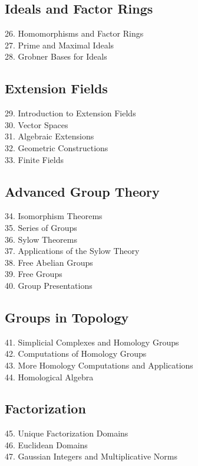 \documentclass{article}
\begin{document}
\begin{spacing}{1.1}
\subsection{Ideals and Factor Rings}
26. Homomorphisms and Factor Rings
\\ 27. Prime and Maximal Ideals
\\ 28. Grobner Bases for Ideals

\subsection{Extension Fields}
29. Introduction to Extension Fields
\\ 30.   Vector Spaces
\\ 31. Algebraic Extensions
\\ 32. Geometric Constructions
\\ 33. Finite Fields

\subsection{Advanced Group Theory}
34. Isomorphism Theorems
\\ 35. Series of Groups
\\ 36. Sylow Theorems
\\ 37. Applications of the Sylow Theory
\\ 38. Free Abelian Groups
\\ 39. Free Groups
\\ 40. Group Presentations

\subsection{Groups in Topology}
41. Simplicial Complexes and Homology Groups
\\ 42. Computations of Homology Groups
\\ 43. More Homology Computations and Applications
\\ 44. Homological Algebra

\subsection{Factorization}
45. Unique Factorization Domains
\\ 46. Euclidean Domains
\\ 47. Gaussian Integers and Multiplicative Norms


\end{spacing}
\end{document}
